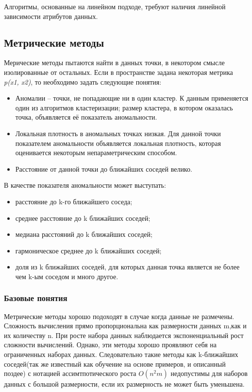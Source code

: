 Алгоритмы, основанные на линейном подходе, требуют  наличия линейной зависимости атрибутов данных. 
\subsection{Метрические методы}
Мерические методы пытаются найти в данных точки, в некотором смысле
изолированные от остальных\cite{Book01}. Если в пространстве задана некоторая метрика \textit{p(x1, x2)}, то необходимо задать следующие понятия:
\begin{itemize}
	\item  Аномалии – точки, не попадающие ни в один кластер. К данным применяется один из алгоритмов кластеризации; размер кластера, в котором оказалась точка, объявляется её показатель аномальности.
	\item Локальная плотность в аномальных точках низкая. Для данной точки показателем аномальности объявляется локальная плотность, которая оценивается некоторым непараметрическим способом.
	\item Расстояние от данной точки до ближайших соседей велико.
\end{itemize}
 В качестве показателя аномальности может выступать:
 \begin{itemize}
\item расстояние до k-го ближайшего соседа;
\item среднее расстояние до k ближайших соседей;
\item медиана расстояний до k ближайших соседей;
\item гармоническое среднее до k ближайших соседей;
\item доля из k ближайших соседей, для которых данная точка является не
более чем k-ым соседом и много другое.
\end{itemize}
\subsubsection{Базовые понятия}
Метрические методы хорошо подоходят в случае когда данные не размечены. Сложность вычисления прямо пропорциональна как размерности данных m,как и их количеству n. При росте набора данных наблюдается экспоненциальный рост сложности вычислений. Однако, эти методы хорошо проявляют себя на ограниченных наборах данных\cite{Book07}. Следовательно такие методы как k-ближайших соседей(так же известный как обучение на основе примеров, и описанный поздее) с нотацией ассимтпотического роста $O(n^2m)$ недопустимы для наборов данных с большой размерности, если их размерность не может быть уменьшена.

